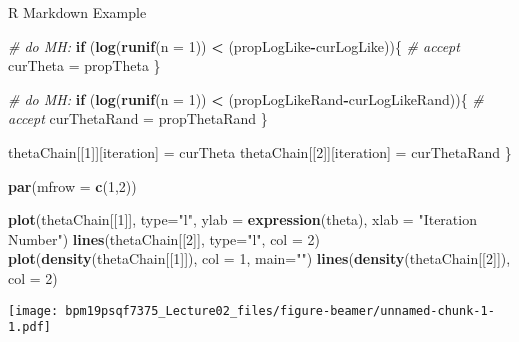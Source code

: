 \documentclass[ignorenonframetext,]{beamer}
\newenvironment{Shaded}{\begin{snugshade}}{\end{snugshade}}
\newcommand{\KeywordTok}[1]{\textcolor[rgb]{0.13,0.29,0.53}{\textbf{#1}}}
\newcommand{\DataTypeTok}[1]{\textcolor[rgb]{0.13,0.29,0.53}{#1}}
\newcommand{\DecValTok}[1]{\textcolor[rgb]{0.00,0.00,0.81}{#1}}
\newcommand{\StringTok}[1]{\textcolor[rgb]{0.31,0.60,0.02}{#1}}
\newcommand{\CommentTok}[1]{\textcolor[rgb]{0.56,0.35,0.01}{\textit{#1}}}
\newcommand{\ControlFlowTok}[1]{\textcolor[rgb]{0.13,0.29,0.53}{\textbf{#1}}}
\newcommand{\OperatorTok}[1]{\textcolor[rgb]{0.81,0.36,0.00}{\textbf{#1}}}
\newcommand{\NormalTok}[1]{#1}
\begin{document}
\begin{frame}[fragile]{R Markdown Example}
\begin{Shaded}
\begin{Highlighting}[]
  \CommentTok{# do MH:}
  \ControlFlowTok{if}\NormalTok{ (}\KeywordTok{log}\NormalTok{(}\KeywordTok{runif}\NormalTok{(}\DataTypeTok{n =} \DecValTok{1}\NormalTok{)) }\OperatorTok{<}\StringTok{ }\NormalTok{(propLogLike}\OperatorTok{-}\NormalTok{curLogLike))\{}
    \CommentTok{# accept}
\NormalTok{    curTheta =}\StringTok{ }\NormalTok{propTheta}
\NormalTok{  \} }

  \CommentTok{# do MH:}
  \ControlFlowTok{if}\NormalTok{ (}\KeywordTok{log}\NormalTok{(}\KeywordTok{runif}\NormalTok{(}\DataTypeTok{n =} \DecValTok{1}\NormalTok{)) }\OperatorTok{<}\StringTok{ }\NormalTok{(propLogLikeRand}\OperatorTok{-}\NormalTok{curLogLikeRand))\{}
    \CommentTok{# accept}
\NormalTok{    curThetaRand =}\StringTok{ }\NormalTok{propThetaRand}
\NormalTok{  \}}
  
\NormalTok{  thetaChain[[}\DecValTok{1}\NormalTok{]][iteration] =}\StringTok{ }\NormalTok{curTheta}
\NormalTok{  thetaChain[[}\DecValTok{2}\NormalTok{]][iteration] =}\StringTok{ }\NormalTok{curThetaRand}
\NormalTok{\}}

\KeywordTok{par}\NormalTok{(}\DataTypeTok{mfrow =} \KeywordTok{c}\NormalTok{(}\DecValTok{1}\NormalTok{,}\DecValTok{2}\NormalTok{))}

\KeywordTok{plot}\NormalTok{(thetaChain[[}\DecValTok{1}\NormalTok{]], }\DataTypeTok{type=}\StringTok{"l"}\NormalTok{, }\DataTypeTok{ylab =} \KeywordTok{expression}\NormalTok{(theta), }\DataTypeTok{xlab =} \StringTok{"Iteration Number"}\NormalTok{)}
\KeywordTok{lines}\NormalTok{(thetaChain[[}\DecValTok{2}\NormalTok{]], }\DataTypeTok{type=}\StringTok{"l"}\NormalTok{, }\DataTypeTok{col =} \DecValTok{2}\NormalTok{)}
\KeywordTok{plot}\NormalTok{(}\KeywordTok{density}\NormalTok{(thetaChain[[}\DecValTok{1}\NormalTok{]]), }\DataTypeTok{col =} \DecValTok{1}\NormalTok{, }\DataTypeTok{main=}\StringTok{""}\NormalTok{)}
\KeywordTok{lines}\NormalTok{(}\KeywordTok{density}\NormalTok{(thetaChain[[}\DecValTok{2}\NormalTok{]]), }\DataTypeTok{col =} \DecValTok{2}\NormalTok{)}
\end{Highlighting}
\end{Shaded}

\texttt{[image: bpm19psqf7375\_Lecture02\_files/figure-beamer/unnamed-chunk-1-1.pdf]}


\end{frame}
\end{document}

